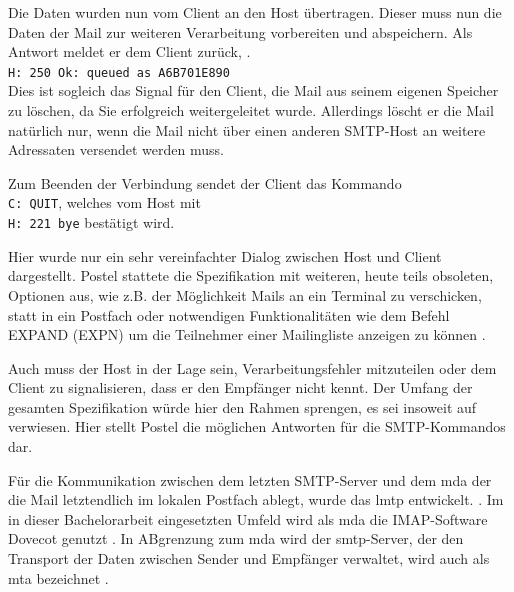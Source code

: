 Die Daten wurden nun vom Client an den Host übertragen. Dieser muss nun die Daten der Mail zur weiteren Verarbeitung vorbereiten und abspeichern. Als Antwort meldet er dem Client zurück,  \citep[][25]{Heinlein2004}.\\
\verb+H: 250 Ok: queued as A6B701E890+ \\
Dies ist sogleich das Signal für den Client, die Mail aus seinem eigenen Speicher zu löschen, da Sie erfolgreich weitergeleitet wurde. Allerdings löscht er die Mail natürlich nur, wenn die Mail nicht über einen anderen SMTP-Host an weitere Adressaten versendet werden muss.

Zum Beenden der Verbindung sendet der Client das Kommando \\
\verb+C: QUIT+, welches vom Host mit \\
\verb+H: 221 bye+ bestätigt wird. 

Hier wurde nur ein sehr vereinfachter Dialog zwischen Host und Client dargestellt. Postel stattete die Spezifikation mit weiteren, heute teils obsoleten, Optionen aus, wie z.B. der Möglichkeit Mails an ein Terminal zu verschicken, statt in ein Postfach \citep[vgl.][11]{rfc821} oder notwendigen Funktionalitäten wie dem Befehl EXPAND (EXPN) um die Teilnehmer einer Mailingliste anzeigen zu können \citep[vgl.][8]{rfc821}.
\citereset

Auch muss der Host in der Lage sein, Verarbeitungsfehler mitzuteilen oder dem Client zu signalisieren, dass er den Empfänger nicht kennt. Der Umfang der gesamten Spezifikation würde hier den Rahmen sprengen, es sei insoweit auf \cite[][S. 37 ff.]{rfc821} verwiesen. Hier stellt Postel die möglichen Antworten für die SMTP-Kommandos dar.

Für die Kommunikation zwischen dem letzten SMTP-Server und dem \ac{mda} \citep[vgl.][28]{Heinlein2004} der die Mail letztendlich im lokalen Postfach ablegt, wurde das \ac{lmtp} entwickelt.  \citep[][39]{Heinlein2004}. Im in dieser Bachelorarbeit eingesetzten Umfeld wird als \ac{mda} die IMAP-Software Dovecot genutzt \citep[vgl.][]{dovecotlmtp}. In ABgrenzung zum \ac{mda} wird der \ac{smtp}-Server, der den Transport der Daten zwischen Sender und Empfänger verwaltet, wird auch als \ac{mta} bezeichnet \citep[vgl.][28]{Heinlein2004}.

